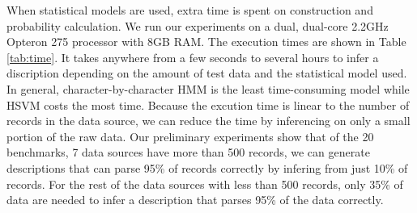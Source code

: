 When statistical models are used,
extra time is spent on \seqset{} construction and probability calculation. 
We run our experiments on a dual, dual-core 2.2GHz Opteron 275 
processor with 8GB RAM. The execution times are shown in Table \ref{tab:time}.
It takes anywhere from a few seconds to several hours to
infer a discription depending on the amount of test data
and the statistical model used. In general, character-by-character
HMM is the least time-consuming model while HSVM costs the most
time.
Because the excution time is linear to the
number of records in the data source, we can reduce the time by 
inferencing on only a small portion of the raw data. Our
preliminary experiments show that of the 20 benchmarks, 7 data sources
have more than 500 records, we can generate descriptions that can
parse 95\% of records correctly by infering from just 10\% of records. 
For the rest of the data sources with less than 500 records, 
only 35\% of data are needed to infer a description that parses 
95\% of the data correctly.

